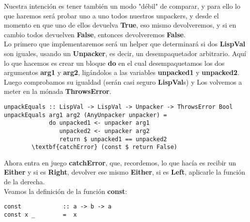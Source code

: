 Nuestra intenci\'on es tener tambi\'en un modo "d\'ebil" de comparar, y para ello lo que haremos ser\'a probar uno a uno todos nuestros unpackers, y desde el momento en que uno de ellos devuelva \textbf{True}, eso mismo devolveremos, y si en cambio todos devuelven \textbf{False}, entonces devolveremos \textbf{False}.\\

Lo primero que implementaremos ser\'a un helper que determinar\'a si dos \textbf{LispVal} son iguales, usando un \textbf{Unpacker}, es decir, un desempaquetador arbitrario. Aqu\'i lo que hacemos es crear un bloque \textbf{do} en el cual desempaquetamos los dos argumentos \textbf{arg1} y \textbf{arg2}, lig\'andolos a las variables \textbf{unpacked1} y \textbf{unpacked2}. Luego comprobamos su igualdad (ser\'an casi seguro \textbf{LispVal}s) y Los volvemos a meter en la m\'onada \textbf{ThrowsError}.\\

\begin{minipage}{\linewidth}
\begin{footnotesize}
\begin{lstlisting}[frame=single]
unpackEquals :: LispVal -> LispVal -> Unpacker -> ThrowsError Bool
unpackEquals arg1 arg2 (AnyUnpacker unpacker) = 
             do unpacked1 <- unpacker arg1
                unpacked2 <- unpacker arg2
                return $ unpacked1 == unpacked2
        \textbf{catchError} (const $ return False)
\end{lstlisting}
\end{footnotesize}
\end{minipage}

Ahora entra en juego \textbf{catchError}, que, recordemos, lo que hac\'ia es recibir un \textbf{Either} y si es \textbf{Right}, devolver ese mismo \textbf{Either}, si es \textbf{Left}, aplicarle la funci\'on de la derecha.\\

Veamos la definici\'on de la funci\'on \textbf{const}:\\

\begin{minipage}{\linewidth}
\begin{footnotesize}
\begin{lstlisting}[frame=single]
const            :: a -> b -> a
const x _        =  x
\end{lstlisting}
\end{footnotesize}
\end{minipage}

